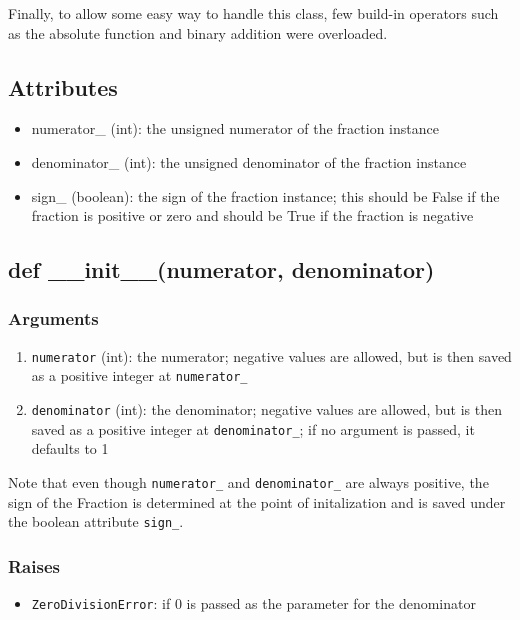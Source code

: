 \documentclass[refman]{scrartcl}
\begin{document}
Finally, to allow some easy way to handle this class, few build-in operators such as the absolute function and binary addition were overloaded.

\subsection{Attributes}

\begin{itemize}
	\item numerator\_ (int): the unsigned numerator of the fraction instance
	\item denominator\_ (int): the unsigned denominator of the fraction instance
	\item sign\_ (boolean): the sign of the fraction instance; this should be False if the fraction is positive or zero and should be True if the fraction is negative
\end{itemize}

\subsection{def \_\_init\_\_(numerator, denominator)}

\subsubsection*{Arguments}

\begin{enumerate}
  \item \texttt{numerator} (int): the numerator; negative values are allowed, but is then saved as a positive integer at \texttt{numerator\_}
  \item \texttt{denominator} (int): the denominator; negative values are allowed, but is then saved as a positive integer at \texttt{denominator\_}; if no argument is passed, it defaults to 1
\end{enumerate}

Note that even though \texttt{numerator\_} and \texttt{denominator\_} are always positive, the sign of the Fraction is determined at the point of initalization and is saved under the boolean attribute \texttt{sign\_}.

\subsubsection*{Raises}

\begin{itemize}
  \item \texttt{ZeroDivisionError}: if \(0\) is passed as the parameter for the denominator
\end{itemize}
\end{document}
